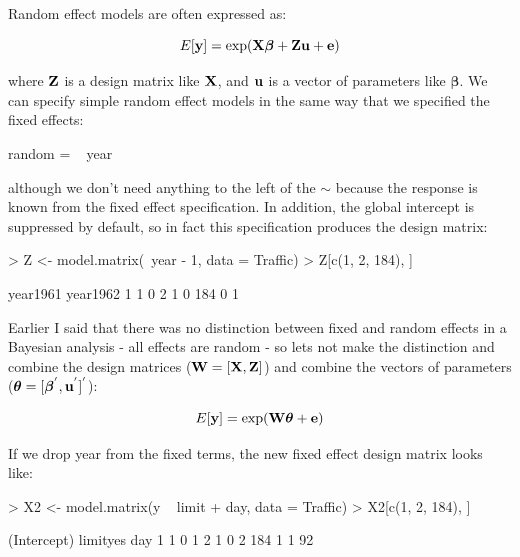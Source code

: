 \documentclass{article}
\begin{document}
Random effect models are often expressed as:

\begin{equation}
E[{\bf y}] = \textrm{exp}({\bf X}{\bm \beta}+{\bf Z}{\bf u}+{\bf e})
\end{equation}

where ${\bf Z}$ is a design matrix like ${\bf X}$, and ${\bf u}$ is a vector of parameters like ${\bm \beta}$. We can specify simple random effect models in the same way that we specified the fixed effects:

\begin{Schunk}
\begin{Soutput}
random =  ~ year
\end{Soutput}
\end{Schunk}

although we don't need anything to the left of the $\sim$ because the response is known from the fixed effect specification. In addition, the global intercept is suppressed by default, so in fact this specification produces the design matrix:

\begin{Schunk}
\begin{Sinput}
> Z <- model.matrix(~year - 1, data = Traffic)
> Z[c(1, 2, 184), ]
\end{Sinput}
\begin{Soutput}
    year1961 year1962
1          1        0
2          1        0
184        0        1
\end{Soutput}
\end{Schunk}

Earlier I said that there was no distinction between fixed and random effects in a Bayesian analysis - all effects are random - so lets not make the distinction and combine the design matrices (${\bf W} = [{\bf X}, {\bf Z}]$) and combine the vectors of parameters (${\bm \theta} = [{\bm \beta}^{'}, {\bf u}^{'}]^{'}$):

\begin{equation}
E[{\bf y}] = \textrm{exp}({\bf W}{\bm \theta}+{\bf e})
\label{MM-eq}
\end{equation}

If we drop year from the fixed terms, the new fixed effect design matrix looks like:

\begin{Schunk}
\begin{Sinput}
> X2 <- model.matrix(y ~ limit + day, data = Traffic)
> X2[c(1, 2, 184), ]
\end{Sinput}
\begin{Soutput}
    (Intercept) limityes day
1             1        0   1
2             1        0   2
184           1        1  92
\end{Soutput}
\end{Schunk}
\end{document}

